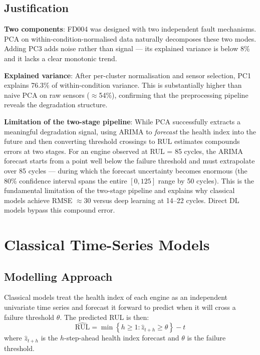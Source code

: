 \documentclass[12pt,a4paper]{report}
\begin{document}
\section{Justification}

\textbf{Two components}: FD004 was designed with two independent fault mechanisms. PCA on within-condition-normalised data naturally decomposes these two modes. Adding PC3 adds noise rather than signal — its explained variance is below 8\% and it lacks a clear monotonic trend.

\textbf{Explained variance}: After per-cluster normalisation and sensor selection, PC1 explains 76.3\% of within-condition variance. This is substantially higher than naive PCA on raw sensors ($\approx$54\%), confirming that the preprocessing pipeline reveals the degradation structure.

\textbf{Limitation of the two-stage pipeline}: While PCA successfully extracts a meaningful degradation signal, using ARIMA to \textit{forecast} the health index into the future and then converting threshold crossings to RUL estimates compounds errors at two stages. For an engine observed at RUL = 85 cycles, the ARIMA forecast starts from a point well below the failure threshold and must extrapolate over 85 cycles — during which the forecast uncertainty becomes enormous (the 80\% confidence interval spans the entire $[0, 125]$ range by 50 cycles). This is the fundamental limitation of the two-stage pipeline and explains why classical models achieve RMSE $\approx 30$ versus deep learning at 14–22 cycles. Direct DL models bypass this compound error.

\chapter{Classical Time-Series Models}
\label{chap:classical}

\section{Modelling Approach}

Classical models treat the health index of each engine as an independent univariate time series and forecast it forward to predict when it will cross a failure threshold $\theta$. The predicted RUL is then:
\[
\widehat{\text{RUL}} = \min\left\{h \geq 1 : \hat{z}_{t+h} \geq \theta\right\} - t
\]
where $\hat{z}_{t+h}$ is the $h$-step-ahead health index forecast and $\theta$ is the failure threshold.
\end{document}
